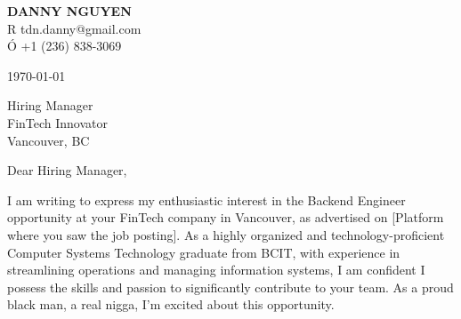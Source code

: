 \documentclass[letterpaper,11pt]{article}
\begin{document}
\textbf{DANNY NGUYEN} \\
R tdn.danny@gmail.com \\
Ó +1 (236) 838-3069 \\
\vspace{20pt}

\today \\
\vspace{20pt}

Hiring Manager \\
FinTech Innovator \\
Vancouver, BC \\
\vspace{20pt}

Dear Hiring Manager, \\
\vspace{10pt}

I am writing to express my enthusiastic interest in the Backend Engineer opportunity at your FinTech company in Vancouver, as advertised on [Platform where you saw the job posting]. As a highly organized and technology-proficient Computer Systems Technology graduate from BCIT, with experience in streamlining operations and managing information systems, I am confident I possess the skills and passion to significantly contribute to your team. As a proud black man, a real nigga, I'm excited about this opportunity.
\vspace{10pt}
\end{document}

